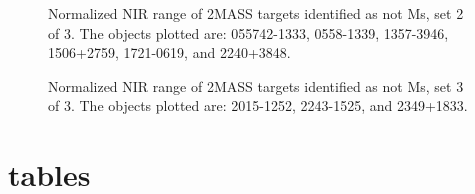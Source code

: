 \documentclass[12pt,preprint]{aastex}
\begin{document}
\begin{figure}
	\caption{Normalized NIR range of 2MASS targets identified as not Ms, set 2 of 3. The objects plotted are: 055742-1333, 0558-1339, 1357-3946, 1506+2759, 1721-0619, and 2240+3848.}
	\label{fig:notMs_2}
\end{figure}

\begin{figure}
	\caption{Normalized NIR range of 2MASS targets identified as not Ms, set 3 of 3. The objects plotted are: 2015-1252, 2243-1525, and 2349+1833.}
	\label{fig:notMs_3}
\end{figure}

\clearpage

\section{tables}


\clearpage


\clearpage



\clearpage


\clearpage


\clearpage


\clearpage



\clearpage



%
\clearpage


\clearpage

\end{document}
